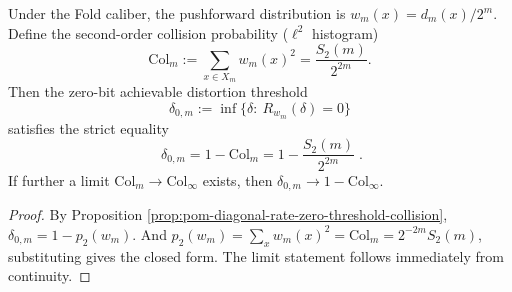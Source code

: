 \begin{corollary}\label{cor:pom-query-distortion-zero-bit-threshold-auditable}
Under the Fold caliber, the pushforward distribution is \(w_m(x)=d_m(x)/2^m\).
Define the second-order collision probability (\(\ell^2\) histogram)
\[
\mathrm{Col}_m:=\sum_{x\in X_m}w_m(x)^2=\frac{S_2(m)}{2^{2m}}.
\]
Then the zero-bit achievable distortion threshold
\[
\delta_{0,m}:=\inf\{\delta:\ R_{w_m}(\delta)=0\}
\]
satisfies the strict equality
\[
\boxed{\;
\delta_{0,m}=1-\mathrm{Col}_m
=1-\frac{S_2(m)}{2^{2m}}\; } .
\]
If further a limit \(\mathrm{Col}_m\to \mathrm{Col}_\infty\) exists, then \(\delta_{0,m}\to 1-\mathrm{Col}_\infty\).
\end{corollary}
\begin{proof}
By Proposition \ref{prop:pom-diagonal-rate-zero-threshold-collision},
\(
\delta_{0,m}=1-p_2(w_m)
\).
And \(p_2(w_m)=\sum_x w_m(x)^2=\mathrm{Col}_m=2^{-2m}S_2(m)\), substituting gives the closed form.
The limit statement follows immediately from continuity.
\end{proof}


